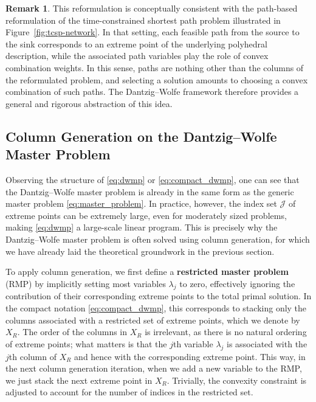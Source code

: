 \documentclass{book}
\theoremstyle{definition}
\newtheorem{remark}[theorem]{Remark}
\numberwithin{algorithm_}{chapter}
\begin{document}
\bigskip

\begin{remark}
This reformulation is conceptually consistent with the path-based reformulation of the time-constrained shortest path problem illustrated in Figure~\ref{fig:tcsp-network}. In that setting, each feasible path from the source to the sink corresponds to an extreme point of the underlying polyhedral description, while the associated path variables play the role of convex combination weights. In this sense, paths are nothing other than the columns of the reformulated problem, and selecting a solution amounts to choosing a convex combination of such paths.
The Dantzig--Wolfe framework therefore provides a general and rigorous abstraction of this idea. 
\end{remark}

\newpage

\subsection{Column Generation on the Dantzig--Wolfe Master Problem}

Observing the structure of \eqref{eq:dwmp} or \eqref{eq:compact_dwmp}, one can see that the Dantzig--Wolfe master problem is already in the same form as the generic master problem \eqref{eq:master_problem}. In practice, however, the index set $\mathcal{J}$ of extreme points can be extremely large, even for moderately sized problems, making \eqref{eq:dwmp} a large-scale linear program. This is precisely why the Dantzig--Wolfe master problem is often solved using column generation, for which we have already laid the theoretical groundwork in the previous section.  

\bigskip

To apply column generation, we first define a \textbf{restricted master problem} (RMP) by implicitly setting most variables $\lambda_j$ to zero, effectively ignoring the contribution of their corresponding extreme points to the total primal solution. In the compact notation \eqref{eq:compact_dwmp}, this corresponds to stacking only the columns associated with a restricted set of extreme points, which we denote by $X_{R}$. The order of the columns in $X_{R}$ is irrelevant, as there is no natural ordering of extreme points; what matters is that the $j$th variable $\lambda_j$ is associated with the $j$th column of $X_{R}$ and hence with the corresponding extreme point. This way, in the next column generation iteration, when we add a new variable to the RMP, we just stack the next extreme point in $X_R$. Trivially, the convexity constraint is adjusted to account for the number of indices in the restricted set.
\end{document}
